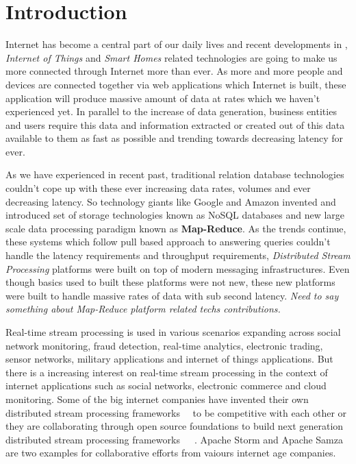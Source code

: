 \documentclass{sig-alternate}
\begin{document}


\section{Introduction}
Internet has become a central part of our daily lives and recent developments in
, \textit{Internet of Things} and \textit{Smart Homes} related
technologies are going to make us more connected through Internet more than ever.
As more and more people and devices are connected together via web applications which
Internet is built, these application will produce massive amount of data at rates which
we haven't experienced yet. In parallel to the increase of data generation, business
entities and users require this data and information extracted or created out of this data
available to them as fast as possible and trending towards decreasing latency for ever.

As we have experienced in recent past, traditional relation database technologies couldn't
cope up with these ever increasing data rates, volumes and ever decreasing latency. So technology
giants like Google and Amazon invented and introduced  set of storage technologies known as
NoSQL databases and new large scale data processing paradigm known as \textbf{Map-Reduce}.
As the trends continue, these systems which follow pull based approach
to answering queries couldn't handle the latency requirements and throughput requirements,
\textit{Distributed Stream Processing} platforms were built on top of modern messaging
infrastructures. Even though basics used to built these platforms were not new, these new
platforms were built to handle massive rates of data with sub second latency. \textit{Need to say
 something about Map-Reduce platform related techs contributions.}

Real-time stream processing is used in various scenarios
expanding across social network monitoring, fraud detection, real-time
analytics, electronic trading, sensor networks, military applications
and internet of things applications. But there is a increasing
interest on real-time stream processing in the context of internet
applications such as social networks, electronic commerce and cloud
monitoring. Some of the big internet companies have invented their own
distributed stream processing frameworks~\cite{akidau2013millwheel}~\cite{murray2013naiad}  to be
competitive with each other or they are collaborating through open source foundations to
build next generation distributed stream processing frameworks~\cite{asf:2014:samza}~\cite{neumeyer2010s4}~\cite{toshniwal2014storm}. Apache
Storm and Apache Samza~\cite{asf:2014:samza} are two examples for collaborative efforts from
vaiours internet age companies.
\end{document}
